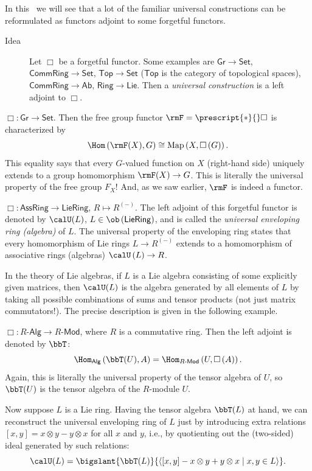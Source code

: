 In this \sect\ we will see that a lot of the familiar universal constructions
can be reformulated as functors adjoint to some forgetful functors. 
\begin{description}
\item [{Idea}] Let $\Box$ be a forgetful functor. Some examples are $\mathsf{Gr}\to\mathsf{Set}$,
$\mathsf{CommRing}\to\mathsf{Set}$, $\mathsf{Top}\to\mathsf{Set}$
($\mathsf{Top}$ is the category of topological spaces), $\mathsf{CommRing}\to\mathsf{Ab}$,
$\mathsf{Ring}\to\mathsf{Lie}$. Then a \emph{universal construction}
is a left adjoint to $\Box$.
\end{description}
\begin{example}
    $\Box:\mathsf{Gr}\to\mathsf{Set}$. Then the free group functor $\rmF=\prescript{\ast}{}\Box$ is characterized
    by 
    \[
    \Hom\left(\rmF(X),G\right)\cong\mathrm{Map}\left(X,\Box\left(G\right)\right).
    \]
    This equality says that every $G$-valued function on $X$ (right-hand
    side) uniquely extends to a group homomorphism $\rmF(X)\to G$. This
    is literally the universal property of the free group $F_{X}$! And, as we saw earlier, $\rmF$ is indeed a functor.
\end{example}
%
\begin{example}
    $\Box:\mathsf{AssRing}\to\mathsf{LieRing}$, $R\mapsto R^{(-)}$.
    The left adjoint of this forgetful functor is denoted by $\calU(L)$,
    $L\in\ob\left(\mathsf{LieRing}\right)$, and is called the \emph{universal
    enveloping ring (algebra)} of $L$. The universal property of the
    enveloping ring states that every homomorphism of Lie rings $L\to R^{(-)}$
    extends to a homomorphism of associative rings (algebras) $\calU\left(L\right)\to R$. 

    In the theory of Lie algebras, if $L$ is a Lie algebra consisting
    of some explicitly given matrices, then $\calU(L)$ is the algebra
    generated by all elements of $L$ by taking all possible combinations
    of sums and tensor products (not just matrix commutators!). The precise description is given in the following example.
\end{example}
%
\begin{example}
$\Box:R\text{-}\mathsf{Alg}\to R\text{-}\mathsf{Mod}$, where $R$
is a commutative ring. Then the left adjoint is denoted by $\bbT$:
\[
\Hom_{\mathsf{Alg}}\left(\bbT(U),A\right)=\Hom_{R\text{-}\mathsf{Mod}}\left(U,\Box\left(A\right)\right).
\]
Again, this is literally the universal property of the tensor algebra
of $U$, so $\bbT(U)$ is the tensor algebra of the $R$-module $U$.

Now suppose $L$ is a Lie ring. Having the tensor algebra $\bbT(L)$ at hand, we can reconstruct the
universal enveloping ring of $L$ just by introducing extra relations
$\left[x,y\right]=x\otimes y-y\otimes x$ for all $x$ and $y$, i.e., by quotienting out the (two-sided) ideal generated by such relations:
\[
\calU(L)=\bigslant{\bbT(L)}{\left\langle [x,y]-x\otimes y+y\otimes x\mid x,y\in L\right\rangle }.
\]
\end{example}
